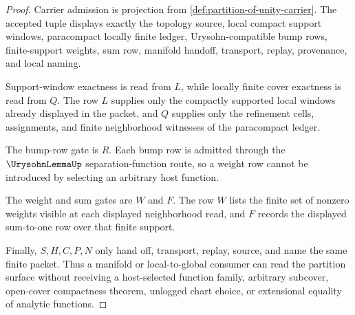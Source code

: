 \begin{proof}
Carrier admission is projection from \autoref{def:partition-of-unity-carrier}. The accepted tuple displays exactly the topology source, local compact support windows, paracompact locally finite ledger, Urysohn-compatible bump rows, finite-support weights, sum row, manifold handoff, transport, replay, provenance, and local naming.

Support-window exactness is read from $L$, while locally finite cover exactness is read from $Q$. The row $L$ supplies only the compactly supported local windows already displayed in the packet, and $Q$ supplies only the refinement cells, assignments, and finite neighborhood witnesses of the paracompact ledger.

The bump-row gate is $R$. Each bump row is admitted through the $\UrysohnLemmaUp$ separation-function route, so a weight row cannot be introduced by selecting an arbitrary host function.

The weight and sum gates are $W$ and $F$. The row $W$ lists the finite set of nonzero weights visible at each displayed neighborhood read, and $F$ records the displayed sum-to-one row over that finite support.

Finally, $S,H,C,P,N$ only hand off, transport, replay, source, and name the same finite packet. Thus a manifold or local-to-global consumer can read the partition surface without receiving a host-selected function family, arbitrary subcover, open-cover compactness theorem, unlogged chart choice, or extensional equality of analytic functions.
\end{proof}

